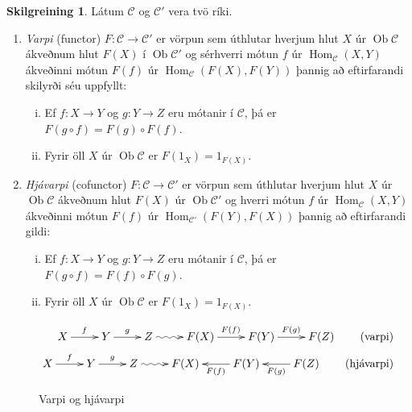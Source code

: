 \documentclass[a4paper,icelandic]{book}
\theoremstyle{definition}
\newtheorem{skilgr}{Skilgreining}[section]
\theoremstyle{plain}
\theoremstyle{remark}
\DeclareMathOperator{\Ob}{Ob}
\DeclareMathOperator{\Hom}{Hom}
\begin{document}
\begin{skilgr}
  Látum $\mathcal C$ og $\mathcal C'$ vera tvö ríki. 
  \begin{enumerate}
    \item \emph{Varpi} (functor) $F:\mathcal C\to\mathcal
      C'$ er vörpun sem úthlutar hverjum hlut $X$ úr $\Ob\mathcal C$
      ákveðnum hlut $F(X)$ í $\Ob\mathcal C'$ og sérhverri mótun $f$ úr
      $\Hom_{\mathcal C}(X,Y)$ ákveðinni mótun $F(f)$ úr
      $\Hom_{\mathcal C}(F(X),F(Y))$ þannig að eftirfarandi skilyrði séu
      uppfyllt:
      \begin{enumerate}[(i)]
        \item Ef $f:X\to Y$ og $g:Y\to Z$ eru mótanir í $\mathcal C$, þá
          er $F(g\circ f) = F(g)\circ F(f)$.
        \item Fyrir öll $X$ úr $\Ob\mathcal C$ er $F(1_X)=1_{F(X)}$. 
      \end{enumerate}
    \item \emph{Hjávarpi} (cofunctor) $F:\mathcal C\to
      \mathcal C'$ er vörpun sem úthlutar hverjum hlut $X$ úr
      $\Ob\mathcal C$ ákveðnum hlut $F(X)$ úr $\Ob\mathcal C'$ og hverri
      mótun $f$ úr $\Hom_{\mathcal C}(X,Y)$ ákveðinni mótun $F(f)$ úr
      $\Hom_{\mathcal C'}(F(Y),F(X))$ þannig að eftirfarandi gildi:
      \begin{enumerate}[(i)]
        \item Ef $f:X\to Y$ og $g:Y\to Z$ eru mótanir í $\mathcal C$, þá
          er $F(g\circ f) = F(f)\circ F(g)$. 
        \item Fyrir öll $X$ úr $\Ob\mathcal C$ er $F(1_X) = 1_{F(X)}$. 
      \end{enumerate}
  \end{enumerate}
\end{skilgr}
\begin{figure}[h]
  \begin{align*}
    \xymatrix{
    X\ar[r]^f & 
    Y \ar[r]^g &
    Z \ar@{~>}[r] &
    F(X) \ar[r]^{F(f)} &
    F(Y) \ar[r]^{F(g)} &
    F(Z)
    }\tag{varpi}
    \\
    \xymatrix{
    X\ar[r]^f & 
    Y \ar[r]^g &
    Z \ar@{~>}[r] &
    F(X) &
    F(Y) \ar[l]^{F(f)} &
    F(Z) \ar[l]^{F(g)}
    }\tag{hjávarpi}
  \end{align*}
  \caption{Varpi og hjávarpi}
  \label{fig:varpi_hjavarpi}
\end{figure}
\end{document}

